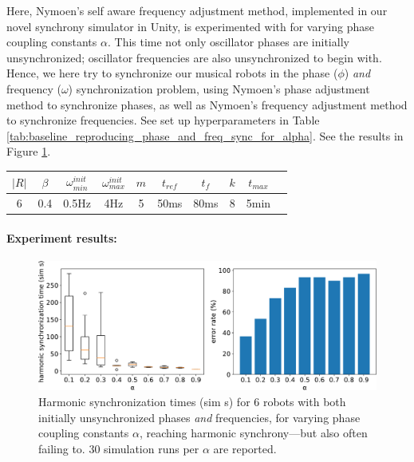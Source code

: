 			Here, Nymoen's self aware frequency adjustment method, implemented in our novel synchrony simulator in Unity, is experimented with for varying phase coupling constants $\alpha$. This time not only oscillator phases are initially unsynchronized; oscillator frequencies are also unsynchronized to begin with. Hence, we here try to synchronize our musical robots in the phase ($\phi$) \textit{and} frequency ($\omega$) synchronization problem, using Nymoen's phase adjustment method to synchronize phases, as well as Nymoen's frequency adjustment method to synchronize frequencies. See set up hyperparameters in Table \ref{tab:baseline_reproducing_phase_and_freq_sync_for_alpha}. See the results in Figure \ref{fig:baseline_reproducing_phase_and_freq_sync_for_alpha}.
			
			\begin{center}
			\begin{tabular}{ |c|c|c|c|c|c|c|c|c|c| } 
			\hline
			$|R|$ & $\beta$ & $\omega_{min}^{init}$ & $\omega_{max}^{init}$ & $m$ & $t_{ref}$ & $t_f$ & $k$ & $t_{max}$ \\
			\hline
			6 & 0.4 & 0.5Hz & 4Hz & 5 & 50ms & 80ms & 8 & 5min \\
			\hline
			\end{tabular}
			\label{tab:baseline_reproducing_phase_and_freq_sync_for_alpha}
			\end{center}
			
			\paragraph{Experiment results:\nl}
			
			\begin{figure}[ht!]
				\centering
				\includegraphics[width=\linewidth]{Assets/DocSegments/Chapters/ExperimentsAndResults/Figures/PerfScores/baseline_reproducing_phase_and_freq_sync_for_alpha.pdf}
				\caption[Experiment results for first $\phi$ \& $\omega$ synchronization baseline reproduction experiment.]{Harmonic synchronization times (sim s) for 6 robots with both initially unsynchronized phases \textit{and} frequencies, for varying phase coupling constants $\alpha$, reaching harmonic synchrony—but also often failing to. 30 simulation runs per $\alpha$ are reported.}
				\label{fig:baseline_reproducing_phase_and_freq_sync_for_alpha}
			\end{figure}
			
